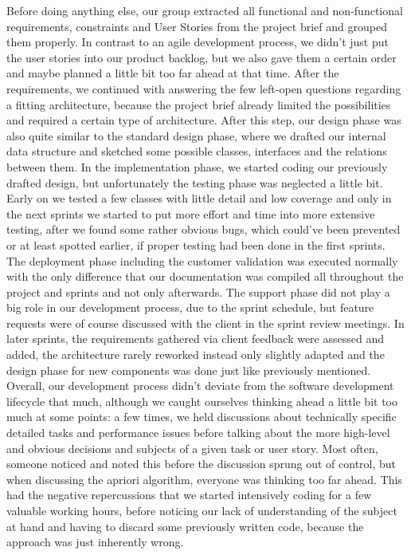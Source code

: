 Before doing anything else, our group extracted all functional and non-functional requirements, constraints and User Stories from the project brief and grouped them properly. In contrast to an agile development process, we didn’t just put the user stories into our product backlog, but we also gave them a certain order and maybe planned a little bit too far ahead at that time. After the requirements, we continued with answering the few left-open questions regarding a fitting architecture, because the project brief already limited the possibilities and required a certain type of architecture. After this step, our design phase was also quite similar to the standard design phase, where we drafted our internal data structure and sketched some possible classes, interfaces and the relations between them. In the implementation phase, we started coding our previously drafted design, but unfortunately the testing phase was neglected a little bit. Early on we tested a few classes with little detail and low coverage and only in the next sprints we started to put more effort and time into more extensive testing, after we found some rather obvious bugs, which could’ve been prevented or at least spotted earlier, if proper testing had been done in the first sprints. The deployment phase including the customer validation was executed normally with the only difference that our documentation was compiled all throughout the project and sprints and not only afterwards. The support phase did not play a big role in our development process, due to the sprint schedule, but feature requests were of course discussed with the client in the sprint review meetings. In later sprints, the requirements gathered via client feedback were assessed and added, the architecture rarely reworked instead only slightly adapted and the design phase for new components was done just like previously mentioned. Overall, our development process didn’t deviate from the software development lifecycle that much, although we caught ourselves thinking ahead a little bit too much at some points: a few times, we held discussions about technically specific detailed tasks and performance issues before talking about the more high-level and obvious decisions and subjects of a given task or user story. Most often, someone noticed and noted this before the discussion sprung out of control, but when discussing the apriori algorithm, everyone was thinking too far ahead. This had the negative repercussions that we started intensively coding for a few valuable working hours, before noticing our lack of understanding of the subject at hand and having to discard some previously written code, because the approach was just inherently wrong. \\
